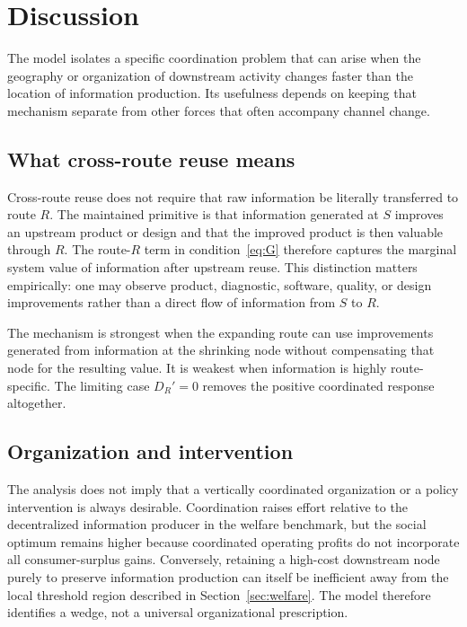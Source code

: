 \section{Discussion}\label{sec:discussion}

The model isolates a specific coordination problem that can arise when the geography or organization of downstream activity changes faster than the location of information production. Its usefulness depends on keeping that mechanism separate from other forces that often accompany channel change.

\subsection{What cross-route reuse means}

Cross-route reuse does not require that raw information be literally transferred to route $R$. The maintained primitive is that information generated at $S$ improves an upstream product or design and that the improved product is then valuable through $R$. The route-$R$ term in condition~\eqref{eq:G} therefore captures the marginal system value of information after upstream reuse. This distinction matters empirically: one may observe product, diagnostic, software, quality, or design improvements rather than a direct flow of information from $S$ to $R$.

The mechanism is strongest when the expanding route can use improvements generated from information at the shrinking node without compensating that node for the resulting value. It is weakest when information is highly route-specific. The limiting case $D_R'=0$ removes the positive coordinated response altogether.

\subsection{Organization and intervention}

The analysis does not imply that a vertically coordinated organization or a policy intervention is always desirable. Coordination raises effort relative to the decentralized information producer in the welfare benchmark, but the social optimum remains higher because coordinated operating profits do not incorporate all consumer-surplus gains. Conversely, retaining a high-cost downstream node purely to preserve information production can itself be inefficient away from the local threshold region described in Section~\ref{sec:welfare}. The model therefore identifies a wedge, not a universal organizational prescription.

